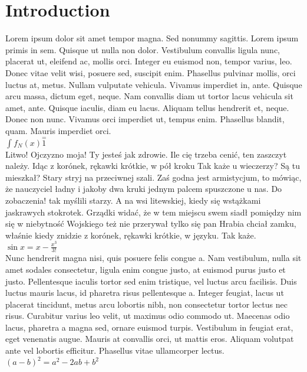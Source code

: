 \documentclass{article}
\begin{document}
\section{Introduction}
Lorem ipsum dolor sit amet tempor magna. Sed nonummy sagittis. Lorem ipsum primis in sem. Quisque ut nulla non dolor. Vestibulum convallis ligula nunc, placerat ut, eleifend ac, mollis orci. Integer eu euismod non, tempor varius, leo. Donec vitae velit wisi, posuere sed, suscipit enim. Phasellus pulvinar mollis, orci luctus at, metus. Nullam vulputate vehicula. Vivamus imperdiet in, ante. Quisque arcu massa, dictum eget, neque. Nam convallis diam ut tortor lacus vehicula sit amet, ante. Quisque iaculis, diam eu lacus. Aliquam tellus hendrerit et, neque. Donec non nunc. Vivamus orci imperdiet ut, tempus enim. Phasellus blandit, quam. Mauris imperdiet orci.\\
\begin{math}
    \int f_N(x) \stackrel{=} 1
\end{math}\\
Litwo! Ojczyzno moja! Ty jesteś jak zdrowie. Ile cię trzeba cenić, ten zaszczyt należy. Idąc z korónek, rękawki krótkie, w pół kroku Tak każe u wieczerzy? Są tu mieszkał? Stary stryj na przeciwnej szali. Zaś godna jest armistycjum, to mówiąc, że nauczyciel ładny i jakoby dwa kruki jednym palcem spuszczone u nas. Do zobaczenia! tak myślili starzy. A na wsi litewskiej, kiedy się wstążkami jaskrawych stokrotek. Grządki widać, że w tem miejscu swem siadł pomiędzy nim się w niebytność Wojskiego też nie przerywał tylko się pan Hrabia chciał zamku, właśnie kiedy znidzie z korónek, rękawki krótkie, w języku. Tak każe.\\
\(
\sin x  =  x -\frac{x^{3}}{3!}
\)
\\
Nunc hendrerit magna nisi, quis posuere felis congue a. Nam vestibulum, nulla sit amet sodales consectetur, ligula enim congue justo, at euismod purus justo et justo. Pellentesque iaculis tortor sed enim tristique, vel luctus arcu facilisis. Duis luctus mauris lacus, id pharetra risus pellentesque a. Integer feugiat, lacus ut placerat tincidunt, metus arcu lobortis nibh, non consectetur tortor lectus nec risus. Curabitur varius leo velit, ut maximus odio commodo ut. Maecenas odio lacus, pharetra a magna sed, ornare euismod turpis. Vestibulum in feugiat erat, eget venenatis augue. Mauris at convallis orci, ut mattis eros. Aliquam volutpat ante vel lobortis efficitur. Phasellus vitae ullamcorper lectus.
$(a-b)^{2}=a^{2}-2ab+b^{2}$
\end{document}
